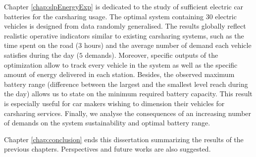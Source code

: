 \medskip
Chapter \ref{chap:slpEnergyExp} is dedicated to the study of sufficient electric car batteries for the carsharing usage.
The optimal system containing $30$ electric vehicles is designed from data randomly generalised.
The results globally reflect realistic operative indicators similar to existing carsharing systems, such as the time spent on the road ($3$ hours) and the average number of demand each vehicle satisfies during the day ($5$ demands).
Moreover, specific outputs of the optimization allow to track every vehicle in the system as well as the specific amount of energy delivered in each station.
Besides, the observed maximum battery range (difference between the largest and the smallest level reach during the day) allows us to state on the minimum required battery capacity.
This result is especially useful for car makers wishing to dimension their vehicles for carsharing services.
Finally, we analyse the consequences of an increasing number of demands on the system sustainability and optimal battery range.


\medskip
Chapter \ref{chap:conclusion} ends this dissertation summarizing the results of the previous chapters.
Perspectives and future works are also suggested.




\newpage
{}
\renewcommand{\bibname}{Bibliography of chapter \thechapter}


